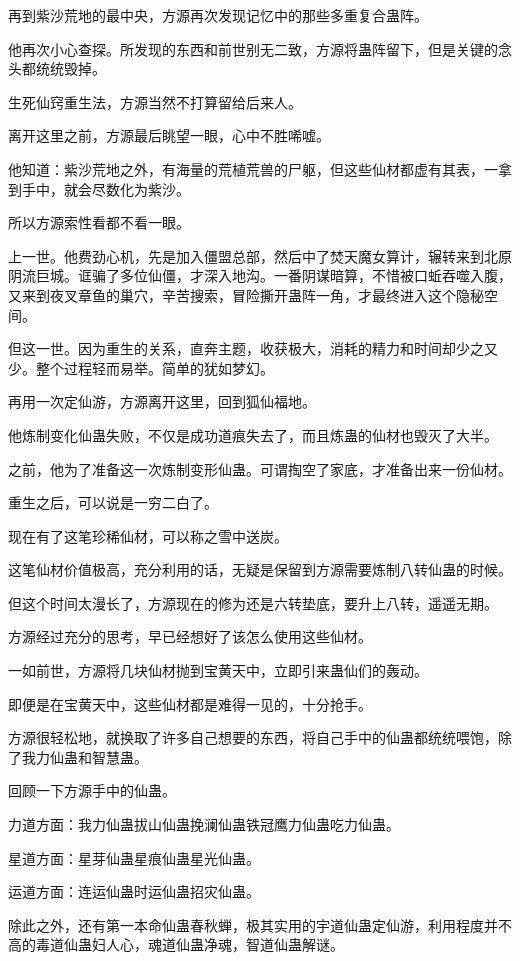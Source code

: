 \begin{this_body}
再到紫沙荒地的最中央，方源再次发现记忆中的那些多重复合蛊阵。

他再次小心查探。所发现的东西和前世别无二致，方源将蛊阵留下，但是关键的念头都统统毁掉。

生死仙窍重生法，方源当然不打算留给后来人。

离开这里之前，方源最后眺望一眼，心中不胜唏嘘。

他知道：紫沙荒地之外，有海量的荒植荒兽的尸躯，但这些仙材都虚有其表，一拿到手中，就会尽数化为紫沙。

所以方源索性看都不看一眼。

上一世。他费劲心机，先是加入僵盟总部，然后中了焚天魔女算计，辗转来到北原阴流巨城。诓骗了多位仙僵，才深入地沟。一番阴谋暗算，不惜被口蚯吞噬入腹，又来到夜叉章鱼的巢穴，辛苦搜索，冒险撕开蛊阵一角，才最终进入这个隐秘空间。

但这一世。因为重生的关系，直奔主题，收获极大，消耗的精力和时间却少之又少。整个过程轻而易举。简单的犹如梦幻。

再用一次定仙游，方源离开这里，回到狐仙福地。

他炼制变化仙蛊失败，不仅是成功道痕失去了，而且炼蛊的仙材也毁灭了大半。

之前，他为了准备这一次炼制变形仙蛊。可谓掏空了家底，才准备出来一份仙材。

重生之后，可以说是一穷二白了。

现在有了这笔珍稀仙材，可以称之雪中送炭。

这笔仙材价值极高，充分利用的话，无疑是保留到方源需要炼制八转仙蛊的时候。

但这个时间太漫长了，方源现在的修为还是六转垫底，要升上八转，遥遥无期。

方源经过充分的思考，早已经想好了该怎么使用这些仙材。

一如前世，方源将几块仙材抛到宝黄天中，立即引来蛊仙们的轰动。

即便是在宝黄天中，这些仙材都是难得一见的，十分抢手。

方源很轻松地，就换取了许多自己想要的东西，将自己手中的仙蛊都统统喂饱，除了我力仙蛊和智慧蛊。

回顾一下方源手中的仙蛊。

力道方面：我力仙蛊拔山仙蛊挽澜仙蛊铁冠鹰力仙蛊吃力仙蛊。

星道方面：星芽仙蛊星痕仙蛊星光仙蛊。

运道方面：连运仙蛊时运仙蛊招灾仙蛊。

除此之外，还有第一本命仙蛊春秋蝉，极其实用的宇道仙蛊定仙游，利用程度并不高的毒道仙蛊妇人心，魂道仙蛊净魂，智道仙蛊解谜。


\end{this_body}
